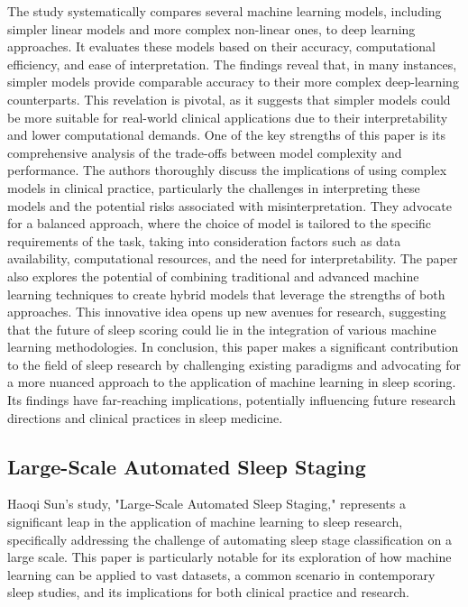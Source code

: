\documentclass[12pt, a4paper,oneside]{book}
\numberwithin{equation}{section}
\begin{document}
The study systematically compares several machine learning models, including simpler linear models and more complex non-linear ones, to deep learning approaches. It evaluates these models based on their accuracy, computational efficiency, and ease of interpretation. The findings reveal that, in many instances, simpler models provide comparable accuracy to their more complex deep-learning counterparts. This revelation is pivotal, as it suggests that simpler models could be more suitable for real-world clinical applications due to their interpretability and lower computational demands.\cite{VanDerDonckt2021}
One of the key strengths of this paper is its comprehensive analysis of the trade-offs between model complexity and performance. The authors thoroughly discuss the implications of using complex models in clinical practice, particularly the challenges in interpreting these models and the potential risks associated with misinterpretation. They advocate for a balanced approach, where the choice of model is tailored to the specific requirements of the task, taking into consideration factors such as data availability, computational resources, and the need for interpretability.\cite{VanDerDonckt2021}
The paper also explores the potential of combining traditional and advanced machine learning techniques to create hybrid models that leverage the strengths of both approaches. This innovative idea opens up new avenues for research, suggesting that the future of sleep scoring could lie in the integration of various machine learning methodologies.\cite{VanDerDonckt2021}
In conclusion, this paper makes a significant contribution to the field of sleep research by challenging existing paradigms and advocating for a more nuanced approach to the application of machine learning in sleep scoring. Its findings have far-reaching implications, potentially influencing future research directions and clinical practices in sleep medicine.\cite{VanDerDonckt2021}

\subsection{Large-Scale Automated Sleep Staging}
Haoqi Sun's study, "Large-Scale Automated Sleep Staging," represents a significant leap in the application of machine learning to sleep research, specifically addressing the challenge of automating sleep stage classification on a large scale. This paper is particularly notable for its exploration of how machine learning can be applied to vast datasets, a common scenario in contemporary sleep studies, and its implications for both clinical practice and research.\cite{Sun2017}
\end{document}
